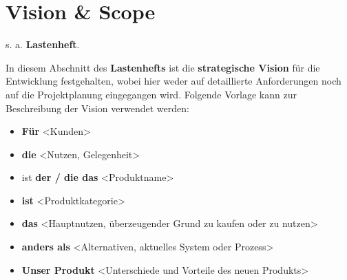 \section{Vision \& Scope}

s. a. \textbf{Lastenheft}.\\

\begin{tcolorbox}[title={Vision der Lösung}]
In diesem Abschnitt des \textbf{Lastenhefts} ist die \textbf{strategische Vision} für die Entwicklung festgehalten, wobei hier weder auf  detaillierte Anforderungen noch auf die Projektplanung eingegangen wird.
Folgende Vorlage kann zur Beschreibung der Vision verwendet werden:
\begin{itemize}
    \item \textbf{Für} <Kunden>
    \item \textbf{die} <Nutzen, Gelegenheit>
    \item ist \textbf{der / die das} <Produktname>
    \item \textbf{ist} <Produktkategorie>
    \item \textbf{das} <Hauptnutzen, überzeugender Grund zu kaufen oder zu nutzen>
    \item \textbf{anders als} <Alternativen, aktuelles System oder Prozess>
    \item \textbf{Unser Produkt} <Unterschiede und Vorteile des neuen Produkts>
\end{itemize}
\end{tcolorbox}